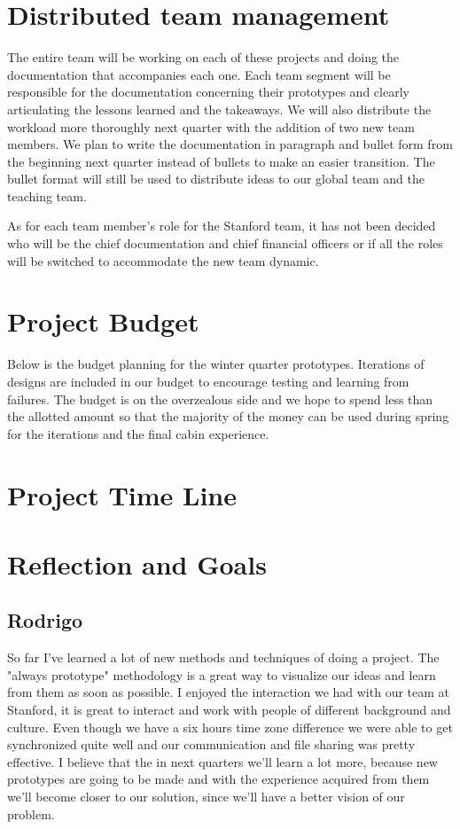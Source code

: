 \documentclass[a4paper, 12pt,conference]{new_cit_thesis}
\begin{document}
\section{Distributed team management}
The entire team will be working on each of these projects and doing the documentation that accompanies each one.  Each team segment will be responsible for the documentation concerning their prototypes and clearly articulating the lessons learned and the takeaways. We will also distribute the workload more thoroughly next quarter with the addition of two new team members.  We plan to write the documentation in paragraph and bullet form from the beginning next quarter instead of bullets to make an easier transition.  The bullet format will still be used to distribute ideas to our global team and the teaching team.  

As for each team member’s role for the Stanford team, it has not been decided who will be the chief documentation and chief financial officers or if all the roles will be switched to accommodate the new team dynamic. 

\section{Project Budget}
Below is the budget planning for the winter quarter prototypes.  Iterations of designs are included in our budget to encourage testing and learning from failures. The budget is on the overzealous side and we hope to spend less than the allotted amount so that the majority of the money can be used during spring for the iterations and the final cabin experience. 

\section{Project Time Line}
\section{Reflection and Goals}
\subsection{Rodrigo}
So far I’ve learned a lot of new methods and techniques of doing a project. The "always prototype" methodology is a great way to visualize our ideas and learn from them as soon as possible.
I enjoyed the interaction we had with our team at Stanford, it is great to interact and work with people of different background and culture. Even though we have a six hours time zone difference we were able to get synchronized quite well and our communication and file sharing was pretty effective.
I believe that the in next quarters we'll learn a lot more, because new prototypes are going to be made and with the experience acquired from them we'll become closer to our solution, since we'll have a better vision of our problem.
\end{document}
